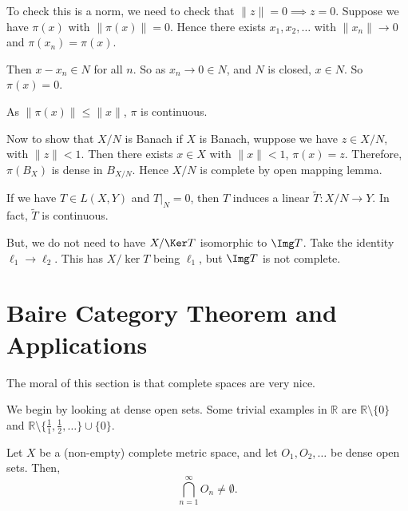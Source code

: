 \documentclass[12pt]{article}
\begin{document}
\begin{proofbox}
	To check this is a norm, we need to check that $\|z\| = 0 \implies z = 0$. Suppose we have $\pi(x)$ with $\|\pi(x)\| = 0$. Hence there exists $x_1, x_2, \ldots$ with $\|x_n\| \to 0$ and $\pi(x_n) = \pi(x)$. 

	Then $x - x_n \in N$ for all $n$. So as $x_n \to 0 \in N$, and $N$ is closed, $x \in N$. So $\pi(x) = 0$.

	As $\|\pi(x)\| \leq \|x\|$, $\pi$ is continuous.

	Now to show that $X/N$ is Banach if $X$ is Banach, wuppose we have $z \in X/N$, with $\|z\| < 1$. Then there exists $x \in X$ with $\|x\| < 1$, $\pi(x) = z$. Therefore, $\pi(B_X)$ is dense in $B_{X/N}$. Hence $X/N$ is complete by open mapping lemma.
\end{proofbox}

If we have $T \in L(X, Y)$ and $T|_N = 0$, then $T$ induces a linear $\tilde T : X/N \to Y$. In fact, $\tilde T$ is continuous.

But, we do not need to have $X / \Ker T$ isomorphic to $\Img T$. Take the identity $\ell_1 \to \ell_2$. This has $X/\ker T$ being $\ell_1$, but $\Img T$ is not complete. 

\newpage

\section{Baire Category Theorem and Applications}
\label{sec:bct}

The moral of this section is that complete spaces are very nice.

We begin by looking at dense open sets. Some trivial examples in $\mathbb{R}$ are $\mathbb{R} \setminus \{0\}$ and $\mathbb{R}\setminus\{\frac{1}{1},\frac{1}{2},\ldots\} \cup \{0\}$.

\begin{theorem}
	Let $X$ be a (non-empty) complete metric space, and let $O_1, O_2, \ldots$ be dense open sets. Then,
	\[
	\bigcap_{n=1}^{\infty} O_n \neq \emptyset.
	\]
\end{theorem}
\end{document}
